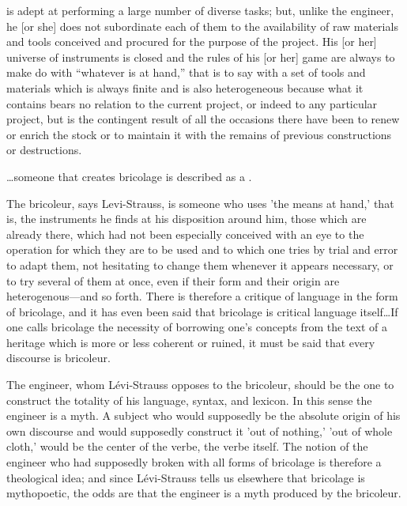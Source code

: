 \begin{blockquote}
[He or she] is adept at performing a large number of diverse tasks; but, unlike the engineer, he [or she] does not subordinate each of them to the availability of raw materials and tools conceived and procured for the purpose of the project. His [or her] universe of instruments is closed and the rules of his [or her] game are always to make do with “whatever is at hand,” that is to say with a set of tools and materials which is always finite and is also heterogeneous because what it contains bears no relation to the current project, or indeed to any particular project, but is the contingent result of all the occasions there have been to renew or enrich the stock or to maintain it with the remains of previous constructions or destructions.\cite{levi1966savage}
\end{blockquote}

\ldots someone that creates bricolage is described as a . 

\begin{blockquote}
The bricoleur, says Levi-Strauss, is someone who uses 'the means at hand,' that is, the instruments he finds at his disposition around him, those which are already there, which had not been especially conceived with an eye to the operation for which they are to be used and to which one tries by trial and error to adapt them, not hesitating to change them whenever it appears necessary, or to try several of them at once, even if their form and their origin are heterogenous---and so forth. There is therefore a critique of language in the form of bricolage, and it has even been said that bricolage is critical language itself\ldots If one calls bricolage the necessity of borrowing one's concepts from the text of a heritage which is more or less coherent or ruined, it must be said that every discourse is bricoleur.\cite{derrida1993structure}
\end{blockquote}

\begin{blockquote}
The engineer, whom Lévi-Strauss opposes to the bricoleur, should be the one to construct the totality of his language, syntax, and lexicon. In this sense the engineer is a myth. A subject who would supposedly be the absolute origin of his own discourse and would supposedly construct it 'out of nothing,' 'out of whole cloth,' would be the center of the verbe, the verbe itself. The notion of the engineer who had supposedly broken with all forms of bricolage is therefore a theological idea; and since Lévi-Strauss tells us elsewhere that bricolage is mythopoetic, the odds are that the engineer is a myth produced by the bricoleur.\cite{derrida1993structure}
\end{blockquote}

